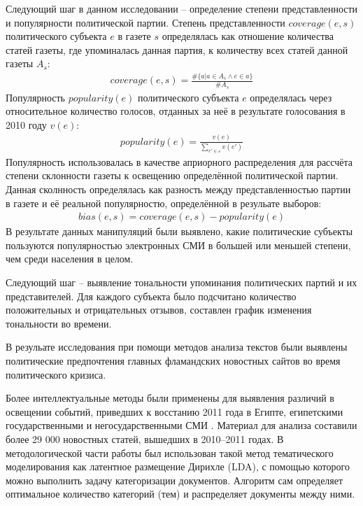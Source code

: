 Следующий шаг в данном исследовании -- определение степени представленности и популярности политической партии. Степень представленности $coverage(e, s)$ политического субъекта $e$ в газете $s$ определялась как отношение количества статей газеты, где упоминалась данная партия, к количеству всех статей данной газеты $A_{s}$:
\begin{eqnarray}
coverage(e, s)=\frac{\# \{a|a \in A_{s} \wedge e \in a \}}{\# A_{s}}
\end{eqnarray}
Популярность $popularity(e)$ политического субъекта $e$ определялась через относительное количество голосов, отданных за неё в результате голосования в 2010 году $v(e)$:
\begin{eqnarray}
popularity(e)=\frac{v(e)}{\sum\limits_{e'\in\varepsilon}v(e')}
\end{eqnarray}
Популярность использовалась в качестве априорного распределения для рассчёта степени склонности газеты к освещению определённой политической партии. Данная сколнность определялась как разность между представленностью партии в газете и её реальной популярностю, определённой в резульате выборов:
\begin{eqnarray}
bias(e, s) = coverage(e, s) - popularity(e)
\end{eqnarray}
В результате данных манипуляций были выявлено, какие политические субъекты пользуются популярностью электронных СМИ в большей или меньшей степени, чем среди населения в целом.

Следующий шаг -- выявление тональности упоминания политических партий и их представителей. Для каждого субъекта было подсчитано количество положительных и отрицательных отзывов, составлен график изменения тональности во времени.

В резульате исследования при помощи методов анализа текстов были выявлены политические предпочтения главных фламандских новостных сайтов во время политического кризиса.

Более интеллектуальные методы были применены для выявления различий в освещении событий, приведших к восстанию 2011 года в Египте, египетскими государственными и негосударственными СМИ \cite{EgyptianUprising2012}. Материал для анализа составили более 29 000 новостных статей, вышедших в 2010--2011 годах. В методологической части работы был использован такой метод тематического моделирования как латентное размещение Дирихле (LDA), с помощью которого можно выполнить задачу категоризации документов. Алгоритм сам определяет оптимальное количество категорий (тем) и распределяет документы между ними. %

